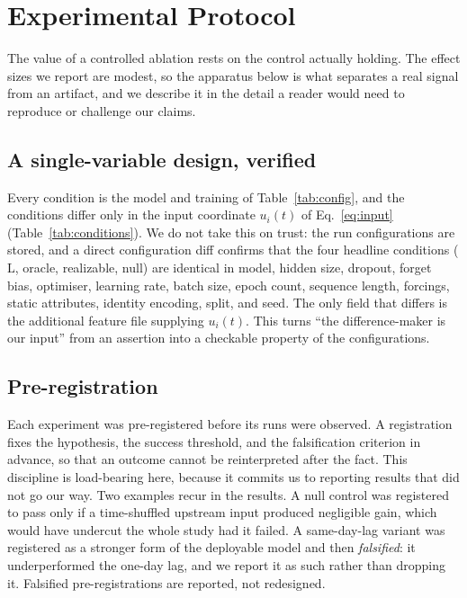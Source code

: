 \documentclass[11pt]{article}
\begin{document}
\section{Experimental Protocol}
\label{sec:protocol}

The value of a controlled ablation rests on the control actually holding. The effect sizes we report
are modest, so the apparatus below is what separates a real signal from an artifact, and we describe
it in the detail a reader would need to reproduce or challenge our claims.

\subsection{A single-variable design, verified}
\label{sec:protocol-design}

Every condition is the model and training of Table~\ref{tab:config}, and the conditions differ only
in the input coordinate $u_i(t)$ of Eq.~\eqref{eq:input} (Table~\ref{tab:conditions}). We do not take
this on trust: the run configurations are stored, and a direct configuration diff confirms that the
four headline conditions ($\mathrm{L}$, oracle, realizable, null) are identical in model, hidden
size, dropout, forget bias, optimiser, learning rate, batch size, epoch count, sequence length,
forcings, static attributes, identity encoding, split, and seed. The only field that differs is the
additional feature file supplying $u_i(t)$. This turns ``the difference-maker is our input'' from an
assertion into a checkable property of the configurations.

\subsection{Pre-registration}
\label{sec:protocol-prereg}

Each experiment was pre-registered before its runs were observed. A registration fixes the
hypothesis, the success threshold, and the falsification criterion in advance, so that an outcome
cannot be reinterpreted after the fact. This discipline is load-bearing here, because it commits us
to reporting results that did not go our way. Two examples recur in the results. A null control was
registered to pass only if a time-shuffled upstream input produced negligible gain, which would have
undercut the whole study had it failed. A same-day-lag variant was registered as a stronger form of
the deployable model and then \emph{falsified}: it underperformed the one-day lag, and we report it
as such rather than dropping it. Falsified pre-registrations are reported, not redesigned.
\end{document}
